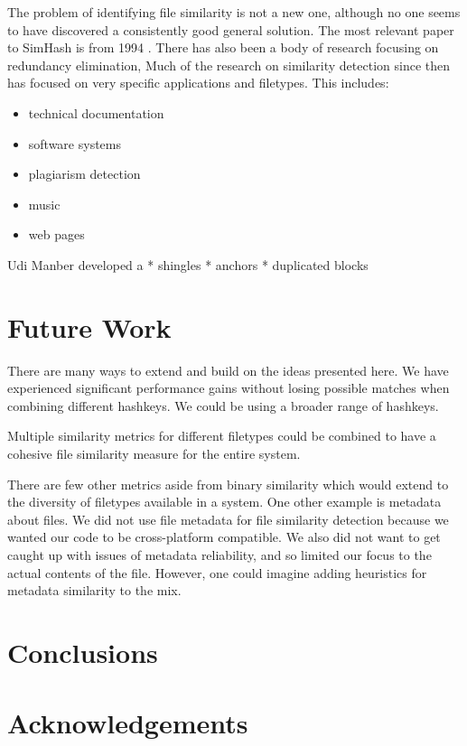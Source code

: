 \documentclass[10pt, twocolumn]{article}
\begin{document}
The problem of identifying file similarity is not a new one, although no one seems to have discovered a consistently good general solution. The most relevant paper to SimHash is from 1994 \cite{manber}. There has also been a body of research focusing on redundancy elimination, Much of the research on similarity detection since then has focused on very specific applications and filetypes. This includes:
\begin{itemize}
\item technical documentation \cite{hpDocRepositories} 
\item software systems \cite{sourcecode} 
\item plagiarism detection \cite{hoad} \cite{bernstein}
\item music \cite{music}
\item web pages \cite{buttler}
\end{itemize}

Udi Manber \cite{manber} developed a 
* shingles
* anchors
* duplicated blocks

\section{Future Work}

There are many ways to extend and build on the ideas presented here. We have experienced significant performance gains without losing possible matches when combining different hashkeys. We could be using a broader range of hashkeys.

Multiple similarity metrics for different filetypes could be combined to have a cohesive file similarity measure for the entire system.

There are few other metrics aside from binary similarity which would extend to the diversity of filetypes available in a system. One other example is metadata about files. We did not use file metadata for file similarity detection because we wanted our code to be cross-platform compatible. We also did not want to get caught up with issues of metadata reliability, and so limited our focus to the actual contents of the file. However, one could imagine adding heuristics for metadata similarity to the mix. 

\section{Conclusions}

\section{Acknowledgements}


\end{document}
